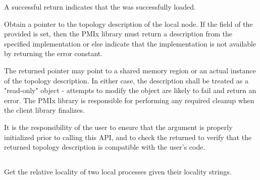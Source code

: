 A successful return indicates that the  was successfully loaded.

\returnsimple

\descr

Obtain a pointer to the topology description of the local node. If the
 field of the provided  is set, then
the \ac{PMIx} library must return a description from the specified
implementation or else indicate that the implementation is not available by
returning the  error constant.

The returned pointer may point to a shared memory region or an actual instance
of the topology description. In either case, the description shall be treated
as a "read-only" object - attempts to modify the object are likely to fail and
return an error. The \ac{PMIx} library is responsible for performing any required cleanup when the client library finalizes.

\adviceuserstart
It is the responsibility of the user to ensure that the  argument
is properly initialized prior to calling this \ac{API}, and to check the
returned  to verify that the returned topology description is
compatible with the user's code.
\adviceuserend

\subsection{}

\summary

Get the relative locality of two local processes given their locality strings.

\format


\begin{arglist}
\end{arglist}

